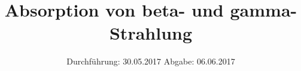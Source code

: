 


\subject{V704}
\title{Absorption von beta- und gamma-Strahlung}
\date{
	Durchführung: 30.05.2017
	\hspace{4em}
	Abgabe: 06.06.2017
}


	\maketitle
	\newpage
	\tableofcontents
	\newpage
	
	
	
	
	
	
	\newpage
	
	\printbibliography

